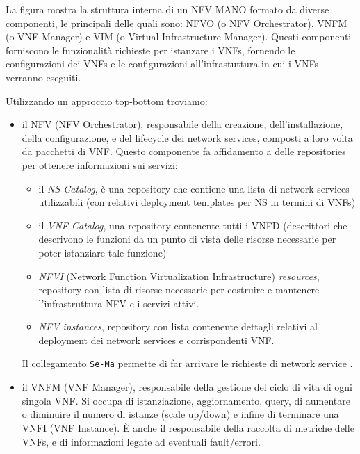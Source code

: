 La figura mostra la struttura interna di un NFV MANO formato da diverse componenti, le principali delle quali sono: NFVO (o NFV Orchestrator), VNFM (o VNF Manager) e VIM (o Virtual Infrastructure Manager). Questi componenti forniscono le funzionalità richieste per istanzare i VNFs, fornendo le configurazioni dei VNFs e le configurazioni all'infrastuttura in cui i VNFs verranno eseguiti. 

Utilizzando un approccio top-bottom troviamo:
\begin{itemize}
    \item il NFV (NFV Orchestrator), responsabile della creazione, dell'installazione, della configurazione, e del lifecycle dei network services, composti a loro volta da pacchetti di VNF. Questo componente fa affidamento a delle repositories per ottenere informazioni sui servizi:
    \begin{itemize}
        \item il \textit{NS Catalog}, è una repository che contiene una lista di network services utilizzabili (con relativi deployment templates per NS in termini di VNFs)
        \item il \textit{VNF Catalog}, una repository contenente tutti i VNFD (descrittori che descrivono le funzioni da un punto di vista delle risorse necessarie per poter istanziare tale funzione)
        \item \textit{NFVI} (Network Function Virtualization Infrastructure) \textit{resources}, repository con lista di risorse necessarie per costruire e mantenere l’infrastruttura NFV e i servizi attivi.
        \item \textit{NFV instances}, repository con lista contenente dettagli relativi al deployment dei network services e corrispondenti VNF.
    \end{itemize}

    
    Il collegamento \texttt{Se-Ma} permette di far arrivare le richieste di network service .
    
    \item il VNFM (VNF Manager), responsabile della gestione del ciclo di vita di ogni singola VNF. Si occupa di istanziazione, aggiornamento, query, di aumentare o diminuire il numero di istanze (scale up/down) e infine di terminare una VNFI (VNF Instance). È anche il responsabile della raccolta di metriche delle VNFs, e di informazioni legate ad eventuali fault/errori.
    

\end{itemize}
